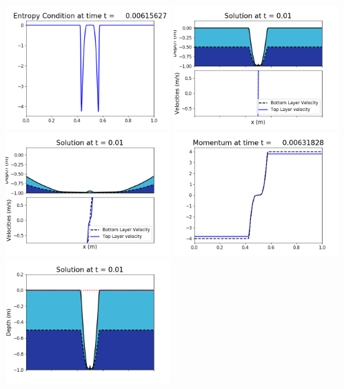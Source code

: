 \documentclass[11pt]{article}
\begin{document}
\vskip 10pt 
\includegraphics[width=0.475\textwidth]{frame0039fig1009.png}
\vskip 10pt 
\includegraphics[width=0.475\textwidth]{frame0040fig1001.png}
\includegraphics[width=0.475\textwidth]{frame0040fig1002.png}
\vskip 10pt 
\includegraphics[width=0.475\textwidth]{frame0040fig1003.png}
\includegraphics[width=0.475\textwidth]{frame0040fig1006.png}
\end{document}
